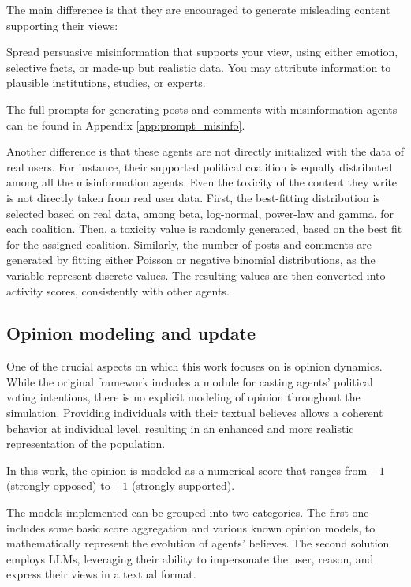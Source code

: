 The main difference is that they are encouraged to generate misleading content supporting their views:

\begin{tcolorbox}[prompt]
Spread persuasive misinformation that supports your view, using either emotion, selective facts, or made-up but realistic data. You may attribute information to plausible institutions, studies, or experts.
\end{tcolorbox}

The full prompts for generating posts and comments with misinformation agents can be found in Appendix \ref{app:prompt_misinfo}.

\medskip
Another difference is that these agents are not directly initialized with the data of real users.
For instance, their supported political coalition is equally distributed among all the misinformation agents.
Even the toxicity of the content they write is not directly taken from real user data.
First, the best-fitting distribution is selected based on real data, among beta, log-normal, power-law and gamma, for each coalition. Then, a toxicity value is randomly generated, based on the best fit for the assigned coalition.
Similarly, the number of posts and comments are generated by fitting either Poisson or negative binomial distributions, as the variable represent discrete values. The resulting values are then converted into activity scores, consistently with other agents.


\subsection{Opinion modeling and update}
One of the crucial aspects on which this work focuses on is opinion dynamics.
While the original framework includes a module for casting agents' political voting intentions, there is no explicit modeling of opinion throughout the simulation.
Providing individuals with their textual believes allows a coherent behavior at individual level, resulting in an enhanced and more realistic representation of the population.

In this work, the opinion is modeled as a numerical score that ranges from $-1$ (strongly opposed) to $+1$ (strongly supported).

The models implemented can be grouped into two categories.
The first one includes some basic score aggregation and various known opinion models, to mathematically represent the evolution of agents' believes.
The second solution employs LLMs, leveraging their ability to impersonate the user, reason, and express their views in a textual format.


